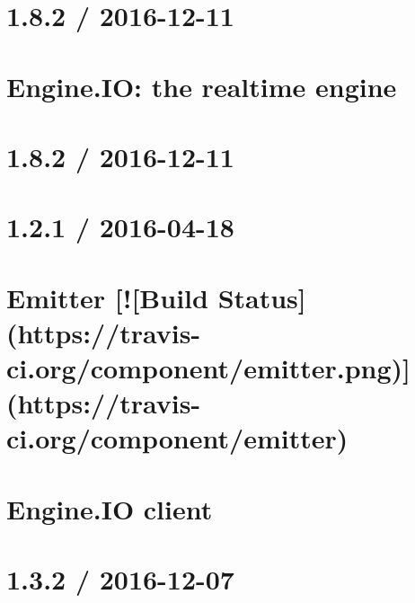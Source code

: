 \documentclass[twoside]{book}
\newcommand{\+}{\discretionary{\mbox{\scriptsize$\hookleftarrow$}}{}{}}
\begin{document}
\chapter{1.8.2 / 2016-\/12-\/11}
\label{md_app_web_node_modules_engine_8io__history}

\chapter{Engine.\+IO\+: the realtime engine}
\label{md_app_web_node_modules_engine_8io__r_e_a_d_m_e}

\chapter{1.8.2 / 2016-\/12-\/11}
\label{md_app_web_node_modules_engine_8io-client__history}

\chapter{1.2.1 / 2016-\/04-\/18}
\label{md_app_web_node_modules_engine_8io-client_node_modules_component-emitter__history}

\chapter{Emitter \mbox{[}!\mbox{[}Build Status\mbox{]}(https\+://travis-\/ci.org/component/emitter.png)\mbox{]}(https\+://travis-\/ci.org/component/emitter)}
\label{md_app_web_node_modules_engine_8io-client_node_modules_component-emitter__readme}

\chapter{Engine.\+IO client}
\label{md_app_web_node_modules_engine_8io-client__r_e_a_d_m_e}

\chapter{1.3.2 / 2016-\/12-\/07}
\label{md_app_web_node_modules_engine_8io-parser__history}

\end{document}
